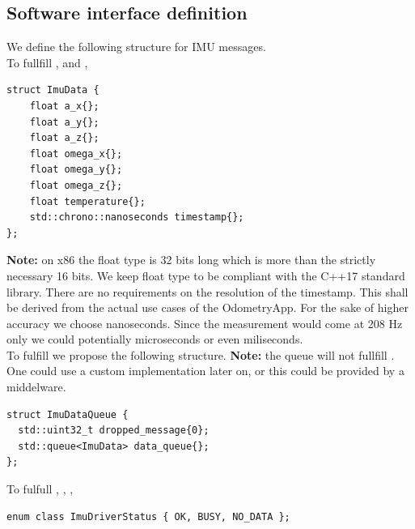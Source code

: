 \subsection{Software interface definition}
We define the following structure for IMU messages.\\
To fullfill ,  and ,
\begin{lstlisting}[style=cppstyle]
struct ImuData {
    float a_x{};
    float a_y{};
    float a_z{};
    float omega_x{};
    float omega_y{};
    float omega_z{};
    float temperature{};
    std::chrono::nanoseconds timestamp{};
};
\end{lstlisting}
\textbf{Note:} on x86 the float type is 32 bits long which is more than the strictly necessary 16 bits. We keep float type to be compliant with the C++17 standard library.
There are no requirements on the resolution of the timestamp. This shall be derived from the actual use cases of the OdometryApp.
For the sake of higher accuracy we choose nanoseconds.
Since the measurement would come at 208 Hz only we could potentially microseconds or even miliseconds.\\

To fulfill  we propose the following structure.
\textbf{Note:} the queue will not fullfill . One could use a custom implementation later on, or this could be provided by a middelware.
\begin{lstlisting}[style=cppstyle]
struct ImuDataQueue {
  std::uint32_t dropped_message{0};
  std::queue<ImuData> data_queue{};
};
\end{lstlisting}

To fulfull , , ,
\begin{lstlisting}[style=cppstyle]
enum class ImuDriverStatus { OK, BUSY, NO_DATA };
\end{lstlisting}

